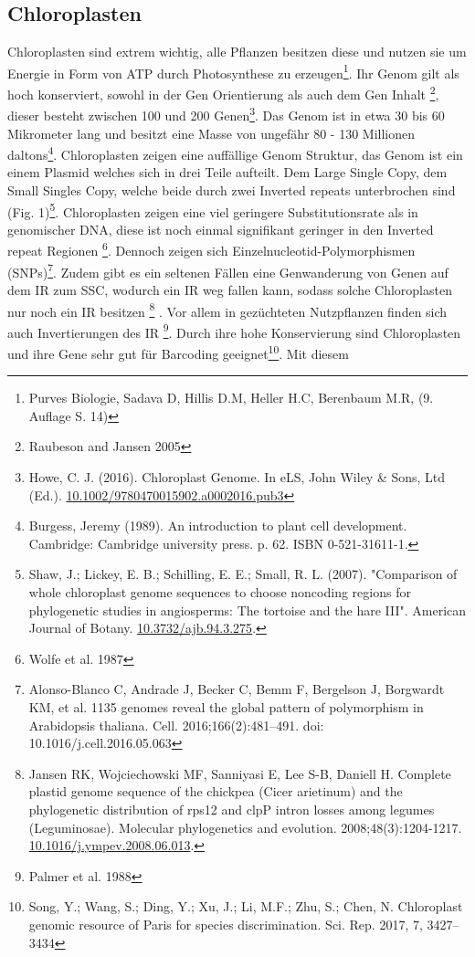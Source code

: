 \documentclass{scrartcl}
\begin{document}
\subsection{Chloroplasten}
\label{sec-2-1}
Chloroplasten sind extrem wichtig, alle Pflanzen besitzen diese und nutzen sie um Energie in Form von ATP durch Photosynthese zu erzeugen\footnote{Purves Biologie, Sadava D, Hillis D.M, Heller H.C, Berenbaum M.R, (9. Auflage S. 14)}.
Ihr Genom gilt als hoch konserviert, sowohl in der Gen Orientierung als auch dem Gen Inhalt \footnote{Raubeson and Jansen 2005}, dieser besteht zwischen 100 und 200 Genen\footnote{Howe, C. J. (2016). Chloroplast Genome. In eLS, John Wiley \& Sons, Ltd (Ed.). \url{10.1002/9780470015902.a0002016.pub3}}. 
Das Genom ist in etwa 30 bis 60 Mikrometer lang und besitzt eine Masse von ungefähr 80 - 130 Millionen daltons\footnote{Burgess, Jeremy (1989). An introduction to plant cell development. Cambridge: Cambridge university press. p. 62. ISBN 0-521-31611-1.}.
Chloroplasten zeigen
eine auffällige Genom Struktur, das Genom ist ein einem Plasmid welches sich in drei Teile aufteilt. Dem Large Single Copy, dem 
Small Singles Copy, welche beide durch zwei Inverted repeats unterbrochen sind (Fig. 1)\footnote{Shaw, J.; Lickey, E. B.; Schilling, E. E.; Small, R. L. (2007). "Comparison of whole chloroplast genome sequences to choose noncoding regions for phylogenetic studies in angiosperms: The tortoise and the hare III". American Journal of Botany. \url{10.3732/ajb.94.3.275}.}. Chloroplasten zeigen eine viel geringere Substitutionsrate
als in genomischer DNA, diese ist noch einmal signifikant geringer in den Inverted repeat Regionen \footnote{Wolfe et al. 1987}. Dennoch zeigen sich
Einzelnucleotid-Polymorphismen (SNPs)\footnote{Alonso-Blanco C, Andrade J, Becker C, Bemm F, Bergelson J, Borgwardt KM, et al. 1135 genomes reveal the global pattern of polymorphism in Arabidopsis thaliana. Cell. 2016;166(2):481–491. doi: 10.1016/j.cell.2016.05.063}. Zudem gibt es ein seltenen Fällen eine Genwanderung von Genen auf dem IR zum SSC, wodurch ein IR weg
fallen kann, sodass solche Chloroplasten nur noch ein IR besitzen \footnote{Jansen RK, Wojciechowski MF, Sanniyasi E, Lee S-B, Daniell H. Complete plastid genome sequence of the chickpea (Cicer arietinum) and the phylogenetic distribution of rps12 and clpP intron losses among legumes (Leguminosae). Molecular phylogenetics and evolution. 2008;48(3):1204-1217. \url{10.1016/j.ympev.2008.06.013}.} . Vor allem in gezüchteten Nutzpflanzen finden sich auch 
Invertierungen des IR \footnote{Palmer et al. 1988}. Durch ihre hohe Konservierung sind Chloroplasten und ihre Gene sehr gut für Barcoding geeignet\footnote{Song, Y.; Wang, S.; Ding, Y.; Xu, J.; Li, M.F.; Zhu, S.; Chen, N. Chloroplast genomic resource of Paris for species discrimination. Sci. Rep. 2017, 7, 3427–3434}. Mit diesem
\end{document}
